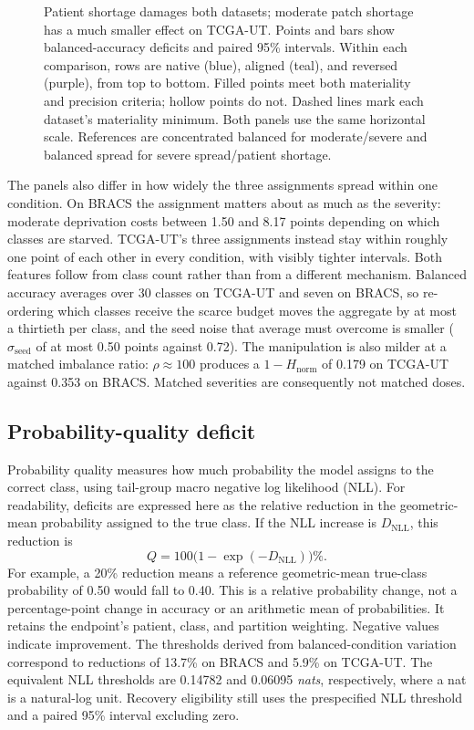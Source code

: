 \documentclass[11pt]{article}
\newcommand{\Hnorm}{1-H_{\mathrm{norm}}}
\begin{document}
\begin{figure}[ht]
\centering

\caption{Patient shortage damages both datasets; moderate patch shortage has a much smaller effect on TCGA-UT. Points and bars show balanced-accuracy deficits and paired 95\% intervals. Within each comparison, rows are native (blue), aligned (teal), and reversed (purple), from top to bottom. Filled points meet both materiality and precision criteria; hollow points do not. Dashed lines mark each dataset's materiality minimum. Both panels use the same horizontal scale. References are concentrated balanced for moderate/severe and balanced spread for severe spread/patient shortage.}
\label{fig:damage-overview}
\end{figure}

\noindent The panels also differ in how widely the three assignments spread within one condition. On BRACS the assignment matters about as much as the severity: moderate deprivation costs between \num{1.50} and \num{8.17} points depending on which classes are starved. TCGA-UT's three assignments instead stay within roughly one point of each other in every condition, with visibly tighter intervals. Both features follow from class count rather than from a different mechanism. Balanced accuracy averages over 30 classes on TCGA-UT and seven on BRACS, so re-ordering which classes receive the scarce budget moves the aggregate by at most a thirtieth per class, and the seed noise that average must overcome is smaller ($\sigma_{\mathrm{seed}}$ of at most \num{0.50} points against \num{0.72}). The manipulation is also milder at a matched imbalance ratio: $\rho\approx\num{100}$ produces a $\Hnorm$ of \num{0.179} on TCGA-UT against \num{0.353} on BRACS. Matched severities are consequently not matched doses.

\subsection{Probability-quality deficit}
\label{sec:rq1-calibration}
Probability quality measures how much probability the model assigns to the correct class, using tail-group macro negative log likelihood (NLL). For readability, deficits are expressed here as the relative reduction in the geometric-mean probability assigned to the true class. If the NLL increase is $D_{\mathrm{NLL}}$, this reduction is
\begin{equation}
  Q = 100\bigl(1-\exp(-D_{\mathrm{NLL}})\bigr)\%.
\end{equation}
\noindent For example, a \num{20}\% reduction means a reference geometric-mean true-class probability of \num{0.50} would fall to \num{0.40}. This is a relative probability change, not a percentage-point change in accuracy or an arithmetic mean of probabilities. It retains the endpoint's patient, class, and partition weighting. Negative values indicate improvement. The thresholds derived from balanced-condition variation correspond to reductions of \num{13.7}\% on BRACS and \num{5.9}\% on TCGA-UT. The equivalent NLL thresholds are \num{0.14782} and \num{0.06095} \emph{nats}, respectively, where a nat is a natural-log unit. Recovery eligibility still uses the prespecified NLL threshold and a paired \num{95}\% interval excluding zero.
\end{document}
